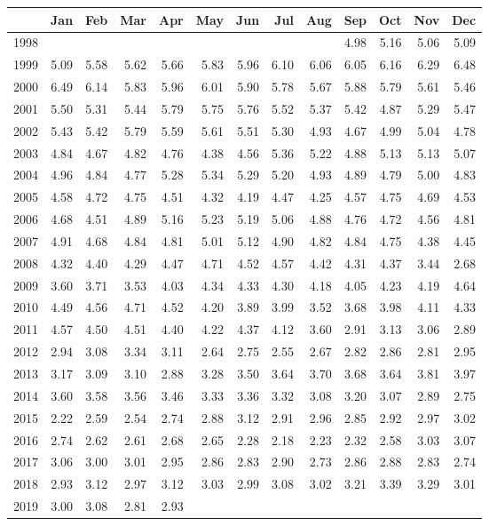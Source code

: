 \begin{longtable}{rrrrrrrrrrrrr}
  \hline
 & Jan & Feb & Mar & Apr & May & Jun & Jul & Aug & Sep & Oct & Nov & Dec \\ 
  \hline
1998 &  &  &  &  &  &  &  &  & 4.98 & 5.16 & 5.06 & 5.09 \\ 
  1999 & 5.09 & 5.58 & 5.62 & 5.66 & 5.83 & 5.96 & 6.10 & 6.06 & 6.05 & 6.16 & 6.29 & 6.48 \\ 
  2000 & 6.49 & 6.14 & 5.83 & 5.96 & 6.01 & 5.90 & 5.78 & 5.67 & 5.88 & 5.79 & 5.61 & 5.46 \\ 
  2001 & 5.50 & 5.31 & 5.44 & 5.79 & 5.75 & 5.76 & 5.52 & 5.37 & 5.42 & 4.87 & 5.29 & 5.47 \\ 
  2002 & 5.43 & 5.42 & 5.79 & 5.59 & 5.61 & 5.51 & 5.30 & 4.93 & 4.67 & 4.99 & 5.04 & 4.78 \\ 
  2003 & 4.84 & 4.67 & 4.82 & 4.76 & 4.38 & 4.56 & 5.36 & 5.22 & 4.88 & 5.13 & 5.13 & 5.07 \\ 
  2004 & 4.96 & 4.84 & 4.77 & 5.28 & 5.34 & 5.29 & 5.20 & 4.93 & 4.89 & 4.79 & 5.00 & 4.83 \\ 
  2005 & 4.58 & 4.72 & 4.75 & 4.51 & 4.32 & 4.19 & 4.47 & 4.25 & 4.57 & 4.75 & 4.69 & 4.53 \\ 
  2006 & 4.68 & 4.51 & 4.89 & 5.16 & 5.23 & 5.19 & 5.06 & 4.88 & 4.76 & 4.72 & 4.56 & 4.81 \\ 
  2007 & 4.91 & 4.68 & 4.84 & 4.81 & 5.01 & 5.12 & 4.90 & 4.82 & 4.84 & 4.75 & 4.38 & 4.45 \\ 
  2008 & 4.32 & 4.40 & 4.29 & 4.47 & 4.71 & 4.52 & 4.57 & 4.42 & 4.31 & 4.37 & 3.44 & 2.68 \\ 
  2009 & 3.60 & 3.71 & 3.53 & 4.03 & 4.34 & 4.33 & 4.30 & 4.18 & 4.05 & 4.23 & 4.19 & 4.64 \\ 
  2010 & 4.49 & 4.56 & 4.71 & 4.52 & 4.20 & 3.89 & 3.99 & 3.52 & 3.68 & 3.98 & 4.11 & 4.33 \\ 
  2011 & 4.57 & 4.50 & 4.51 & 4.40 & 4.22 & 4.37 & 4.12 & 3.60 & 2.91 & 3.13 & 3.06 & 2.89 \\ 
  2012 & 2.94 & 3.08 & 3.34 & 3.11 & 2.64 & 2.75 & 2.55 & 2.67 & 2.82 & 2.86 & 2.81 & 2.95 \\ 
  2013 & 3.17 & 3.09 & 3.10 & 2.88 & 3.28 & 3.50 & 3.64 & 3.70 & 3.68 & 3.64 & 3.81 & 3.97 \\ 
  2014 & 3.60 & 3.58 & 3.56 & 3.46 & 3.33 & 3.36 & 3.32 & 3.08 & 3.20 & 3.07 & 2.89 & 2.75 \\ 
  2015 & 2.22 & 2.59 & 2.54 & 2.74 & 2.88 & 3.12 & 2.91 & 2.96 & 2.85 & 2.92 & 2.97 & 3.02 \\ 
  2016 & 2.74 & 2.62 & 2.61 & 2.68 & 2.65 & 2.28 & 2.18 & 2.23 & 2.32 & 2.58 & 3.03 & 3.07 \\ 
  2017 & 3.06 & 3.00 & 3.01 & 2.95 & 2.86 & 2.83 & 2.90 & 2.73 & 2.86 & 2.88 & 2.83 & 2.74 \\ 
  2018 & 2.93 & 3.12 & 2.97 & 3.12 & 3.03 & 2.99 & 3.08 & 3.02 & 3.21 & 3.39 & 3.29 & 3.01 \\ 
  2019 & 3.00 & 3.08 & 2.81 & 2.93 &  &  &  &  &  &  &  &  \\ 
   \hline
\hline
\end{longtable}
